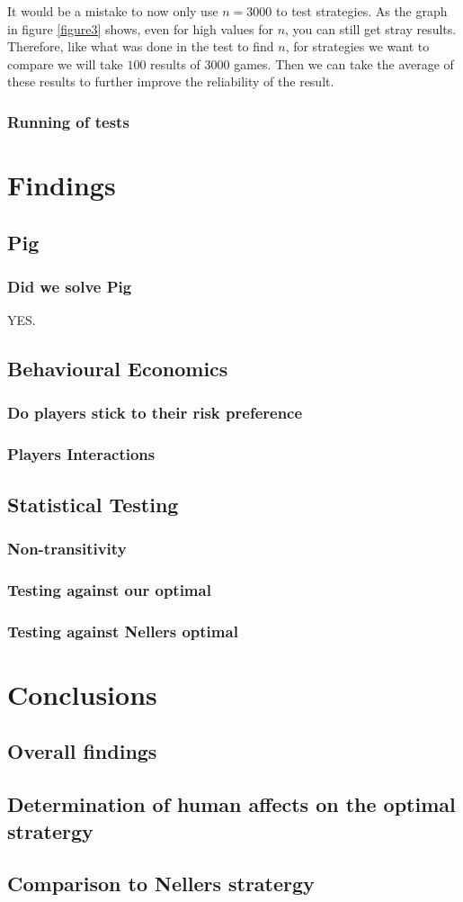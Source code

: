 \documentclass[a4paper,titlepage]{article}
\begin{document}
It would be a mistake to now only use $n=3000$ to test strategies. As the graph in figure \ref{figure3} shows, even for high values for $n$, you can still get stray results. Therefore, like what was done in the test to find $n$, for strategies we want to compare we will take $100$ results of $3000$ games. Then we can take the average of these results to further improve the reliability of the result. 
\subsubsection{Running of tests}


\section{Findings}
\subsection{Pig}
\subsubsection{Did we solve Pig}
{\tiny YES.}

\subsection{Behavioural Economics}
\subsubsection{Do players stick to their risk preference}
\subsubsection{Players Interactions}

\subsection{Statistical Testing}
\subsubsection{Non-transitivity}
\subsubsection{Testing against our optimal}
\subsubsection{Testing against Nellers optimal}


\section{Conclusions}
\subsection{Overall findings}
\subsection{Determination of human affects on the optimal stratergy}
\subsection{Comparison to Nellers stratergy}

\nocite{*}


\end{document}
